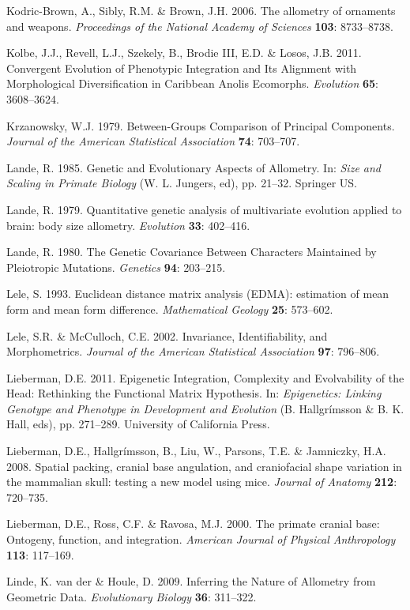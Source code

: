 \documentclass[12pt,twoside]{report}
\begin{document}
Kodric-Brown, A., Sibly, R.M. \& Brown, J.H. 2006. The allometry of
ornaments and weapons. \emph{Proceedings of the National Academy of
Sciences} \textbf{103}: 8733--8738.

Kolbe, J.J., Revell, L.J., Szekely, B., Brodie III, E.D. \& Losos, J.B.
2011. Convergent Evolution of Phenotypic Integration and Its Alignment
with Morphological Diversification in Caribbean Anolis Ecomorphs.
\emph{Evolution} \textbf{65}: 3608--3624.

Krzanowsky, W.J. 1979. Between-Groups Comparison of Principal
Components. \emph{Journal of the American Statistical Association}
\textbf{74}: 703--707.

Lande, R. 1985. Genetic and Evolutionary Aspects of Allometry. In:
\emph{Size and Scaling in Primate Biology} (W. L. Jungers, ed), pp.
21--32. Springer US.

Lande, R. 1979. Quantitative genetic analysis of multivariate evolution
applied to brain: body size allometry. \emph{Evolution} \textbf{33}:
402--416.

Lande, R. 1980. The Genetic Covariance Between Characters Maintained by
Pleiotropic Mutations. \emph{Genetics} \textbf{94}: 203--215.

Lele, S. 1993. Euclidean distance matrix analysis (EDMA): estimation of
mean form and mean form difference. \emph{Mathematical Geology}
\textbf{25}: 573--602.

Lele, S.R. \& McCulloch, C.E. 2002. Invariance, Identifiability, and
Morphometrics. \emph{Journal of the American Statistical Association}
\textbf{97}: 796--806.

Lieberman, D.E. 2011. Epigenetic Integration, Complexity and
Evolvability of the Head: Rethinking the Functional Matrix Hypothesis.
In: \emph{Epigenetics: Linking Genotype and Phenotype in Development and
Evolution} (B. Hallgrímsson \& B. K. Hall, eds), pp. 271--289.
University of California Press.

Lieberman, D.E., Hallgrímsson, B., Liu, W., Parsons, T.E. \& Jamniczky,
H.A. 2008. Spatial packing, cranial base angulation, and craniofacial
shape variation in the mammalian skull: testing a new model using mice.
\emph{Journal of Anatomy} \textbf{212}: 720--735.

Lieberman, D.E., Ross, C.F. \& Ravosa, M.J. 2000. The primate cranial
base: Ontogeny, function, and integration. \emph{American Journal of
Physical Anthropology} \textbf{113}: 117--169.

Linde, K. van der \& Houle, D. 2009. Inferring the Nature of Allometry
from Geometric Data. \emph{Evolutionary Biology} \textbf{36}: 311--322.
\end{document}
